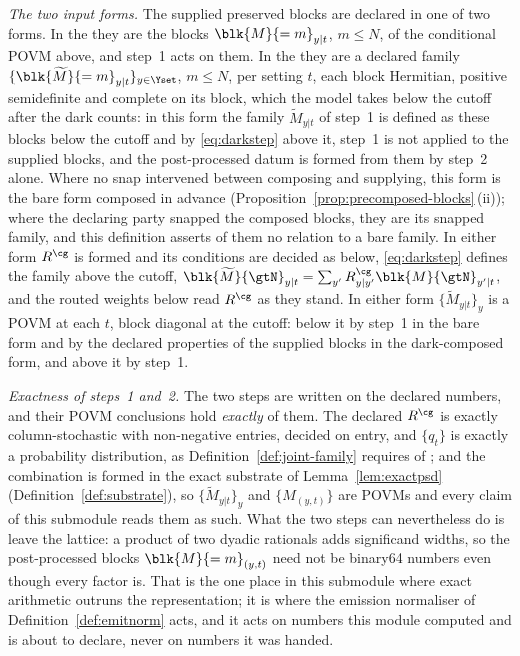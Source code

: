 \begin{definition}
\emph{The two input forms.} The supplied preserved blocks are declared in one
of two forms. In the
they are the blocks $\blk{M}{=m}_{y|t}$, $m\le N$, of the conditional POVM
above, and step~1 acts on them. In the
they are a declared family $\{\blk{\widetilde M}{=m}_{y|t}\}_{y\in\Yset}$,
$m\le N$, per setting $t$, each block Hermitian, positive semidefinite and
complete on its block, which the model takes below the cutoff after the
dark counts: in this form the family $\widetilde M_{y|t}$ of step~1 is
defined as these blocks below the cutoff and by \eqref{eq:darkstep} above
it, step~1 is not applied to the supplied blocks, and the post-processed
datum is formed from them by step~2 alone. Where no snap intervened between
composing and supplying, this form is the bare form composed in advance
(Proposition~\ref{prop:precomposed-blocks}\,(ii)); where the declaring party
snapped the composed blocks, they are its snapped family, and this
definition asserts of them no relation to a bare family. In either form $R^{\cg}$ is
formed and its conditions are decided as below, \eqref{eq:darkstep} defines
the family above the cutoff, $\blk{\widetilde M}{\gtN}_{y|t}
=\sum_{y'}R^{\cg}_{y|y'}\blk{M}{\gtN}_{y'|t}$, and the routed weights below
read $R^{\cg}$ as they stand. In either form $\{\widetilde M_{y|t}\}_y$ is a
POVM at each $t$, block diagonal at the cutoff: below it by step~1 in the
bare form and by the declared properties of the supplied blocks in the
dark-composed form, and above it by step~1.

\emph{Exactness of steps~1 and~2.} The two steps are written on the declared
numbers, and their POVM conclusions hold \emph{exactly} of them. The declared
$R^{\cg}$ is exactly column-stochastic with non-negative entries, decided on
entry, and $\{q_t\}$ is
exactly a probability distribution, as Definition~\ref{def:joint-family}
requires of ; and the combination is formed in the exact
substrate of Lemma~\ref{lem:exactpsd} (Definition~\ref{def:substrate}), so
$\{\widetilde M_{y|t}\}_y$ and $\{M_{(y,t)}\}$ are POVMs and every claim of
this submodule reads them as such. What the two steps can nevertheless do is
leave the lattice: a product of two dyadic rationals adds significand widths,
so the post-processed blocks $\blk{M}{=m}_{(y,t)}$ need not be binary64
numbers even though every factor is. That is the one place in this submodule
where exact arithmetic outruns the representation; it is where the emission
normaliser of Definition~\ref{def:emitnorm} acts, and it acts on numbers this
module computed and is about to declare, never on numbers it was handed.


\end{definition}
